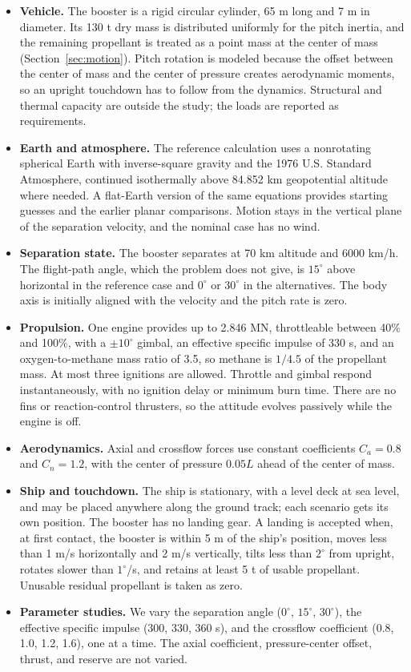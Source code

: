 \begin{itemize}
\item \textbf{Vehicle.} The booster is a rigid circular cylinder, 65 m long and 7 m in diameter. Its 130 t dry mass is distributed uniformly for the pitch inertia, and the remaining propellant is treated as a point mass at the center of mass (Section~\ref{sec:motion}). Pitch rotation is modeled because the offset between the center of mass and the center of pressure creates aerodynamic moments, so an upright touchdown has to follow from the dynamics. Structural and thermal capacity are outside the study; the loads are reported as requirements.
\item \textbf{Earth and atmosphere.} The reference calculation uses a nonrotating spherical Earth with inverse-square gravity and the 1976 U.S. Standard Atmosphere, continued isothermally above 84.852 km geopotential altitude where needed. A flat-Earth version of the same equations provides starting guesses and the earlier planar comparisons. Motion stays in the vertical plane of the separation velocity, and the nominal case has no wind.
\item \textbf{Separation state.} The booster separates at 70 km altitude and 6000 km/h. The flight-path angle, which the problem does not give, is $15^\circ$ above horizontal in the reference case and $0^\circ$ or $30^\circ$ in the alternatives. The body axis is initially aligned with the velocity and the pitch rate is zero.
\item \textbf{Propulsion.} One engine provides up to 2.846 MN, throttleable between 40\% and 100\%, with a $\pm10^\circ$ gimbal, an effective specific impulse of 330 s, and an oxygen-to-methane mass ratio of 3.5, so methane is $1/4.5$ of the propellant mass. At most three ignitions are allowed. Throttle and gimbal respond instantaneously, with no ignition delay or minimum burn time. There are no fins or reaction-control thrusters, so the attitude evolves passively while the engine is off.
\item \textbf{Aerodynamics.} Axial and crossflow forces use constant coefficients $C_a=0.8$ and $C_n=1.2$, with the center of pressure $0.05L$ ahead of the center of mass.
\item \textbf{Ship and touchdown.} The ship is stationary, with a level deck at sea level, and may be placed anywhere along the ground track; each scenario gets its own position. The booster has no landing gear. A landing is accepted when, at first contact, the booster is within 5 m of the ship's position, moves less than 1 m/s horizontally and 2 m/s vertically, tilts less than $2^\circ$ from upright, rotates slower than $1^\circ$/s, and retains at least 5 t of usable propellant. Unusable residual propellant is taken as zero.
\item \textbf{Parameter studies.} We vary the separation angle ($0^\circ$, $15^\circ$, $30^\circ$), the effective specific impulse (300, 330, 360 s), and the crossflow coefficient (0.8, 1.0, 1.2, 1.6), one at a time. The axial coefficient, pressure-center offset, thrust, and reserve are not varied.
\end{itemize}
